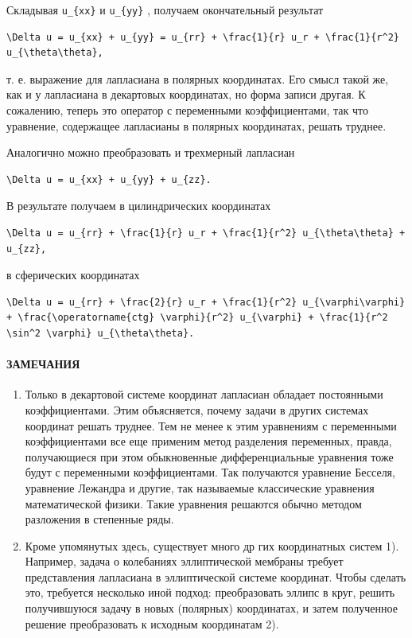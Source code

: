 \documentclass[
  ukrainian,
]{article}
\begin{document}
Складывая \texttt{u\_\{xx\}} и \texttt{u\_\{yy\}} , получаем
окончательный результат

\begin{verbatim}
\Delta u = u_{xx} + u_{yy} = u_{rr} + \frac{1}{r} u_r + \frac{1}{r^2} u_{\theta\theta},
\end{verbatim}

т. е. выражение для лапласиана в полярных координатах. Его смысл такой
же, как и у лапласиана в декартовых координатах, но форма записи другая.
К сожалению, теперь это оператор с переменными коэффициентами, так что
уравнение, содержащее лапласианы в полярных координатах, решать труднее.

Аналогично можно преобразовать и трехмерный лапласиан

\begin{verbatim}
\Delta u = u_{xx} + u_{yy} + u_{zz}.
\end{verbatim}

В результате получаем в цилиндрических координатах

\begin{verbatim}
\Delta u = u_{rr} + \frac{1}{r} u_r + \frac{1}{r^2} u_{\theta\theta} + u_{zz},
\end{verbatim}

в сферических координатах

\begin{verbatim}
\Delta u = u_{rr} + \frac{2}{r} u_r + \frac{1}{r^2} u_{\varphi\varphi} + \frac{\operatorname{ctg} \varphi}{r^2} u_{\varphi} + \frac{1}{r^2 \sin^2 \varphi} u_{\theta\theta}.
\end{verbatim}

\paragraph{ЗАМЕЧАНИЯ}\label{ux437ux430ux43cux435ux447ux430ux43dux438ux44f-3}

\begin{enumerate}
\def\labelenumi{\arabic{enumi}.}
\item
  Только в декартовой системе координат лапласиан обладает постоянными
  коэффициентами. Этим объясняется, почему задачи в других системах
  координат решать труднее. Тем не менее к этим уравнениям с переменными
  коэффициентами все еще применим метод разделения переменных, правда,
  получающиеся при этом обыкновенные дифференциальные уравнения тоже
  будут с переменными коэффициентами. Так получаются уравнение Бесселя,
  уравнение Лежандра и другие, так называемые классические уравнения
  математической физики. Такие уравнения решаются обычно методом
  разложения в степенные ряды.
\item
  Кроме упомянутых здесь, существует много др гих координатных систем
  1). Например, задача о колебаниях эллиптической мембраны требует
  представления лапласиана в эллиптической системе координат. Чтобы
  сделать это, требуется несколько иной подход: преобразовать эллипс в
  круг, решить получившуюся задачу в новых (полярных) координатах, и
  затем полученное решение преобразовать к исходным координатам 2).
\end{enumerate}
\end{document}
